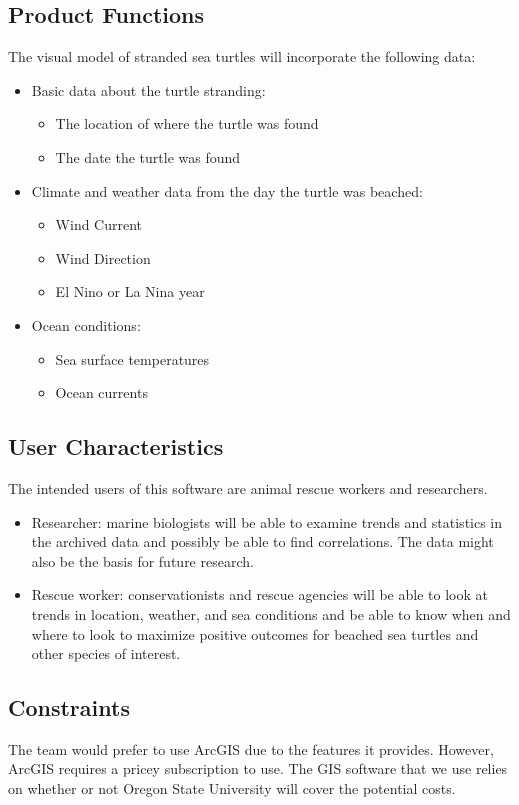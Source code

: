 \documentclass[onecolumn, draftclsnofoot,10pt, compsoc]{IEEEtran}
\begin{document}
\begin{singlespace}
\subsection{Product Functions}
The visual model of stranded sea turtles will incorporate the following data:
    \begin{itemize}
        \item Basic data about the turtle stranding:
        \begin{itemize}
            \item The location of where the turtle was found
            \item The date the turtle was found        
        \end{itemize}
        \item Climate and weather data from the day the turtle was beached:
        \begin{itemize}
            \item Wind Current 
            \item Wind Direction
            \item El Nino or La Nina year
        \end{itemize}
        \item Ocean conditions:
        \begin{itemize}
            \item Sea surface temperatures
            \item Ocean currents
        \end{itemize}
    \end{itemize}
\subsection{User Characteristics}
    The intended users of this software are animal rescue workers and researchers.  
    \begin{itemize}
        \item Researcher: marine biologists will be able to examine trends and statistics in the archived data and possibly be able to find correlations.  The data might also be the basis for future research. 
        \item Rescue worker: conservationists and rescue agencies will be able to look at trends in location, weather, and sea conditions and be able to know when and where to look to maximize positive outcomes for beached sea turtles and other species of interest.
    \end{itemize} 
\subsection{Constraints}
The team would prefer to use ArcGIS due to the features it provides. However, ArcGIS requires a pricey subscription to use. The GIS software that we use relies on whether or not Oregon State University will cover the potential costs.  

\end{singlespace}
\end{document}

